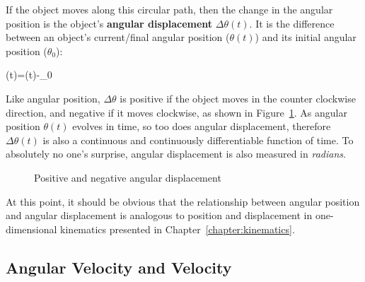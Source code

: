 If the object moves along this circular path, then the change in the angular
position is the object's
\textbf{angular displacement}
$\Delta\theta(t)$. It is the difference between an object's current/final
angular position ($\theta(t)$) and its initial angular position ($\theta_0$):
\begin{important-equation}
  \Delta\theta(t)=\theta(t)-\theta_0
  \label{eq:angular-displacement}
\end{important-equation}
Like angular position, $\Delta\theta$ is positive if the object moves in the
counter clockwise direction, and negative if it moves clockwise, as shown in
Figure~\ref{fig:angular-displacement}. As angular position $\theta(t)$ evolves
in time, so too does angular displacement, therefore $\Delta\theta(t)$ is also a
continuous and continuously differentiable function of time. To absolutely no
one's surprise, angular displacement is also measured in \emph{radians}.

\begin{figure}[ht]
  \centering
  \caption{Positive and negative angular displacement}
  \label{fig:angular-displacement}
\end{figure}
At this point, it should be obvious that the relationship between angular
position and angular displacement is analogous to position and displacement in
one-dimensional kinematics presented in Chapter~\ref{chapter:kinematics}.


\subsection{Angular Velocity and Velocity}

